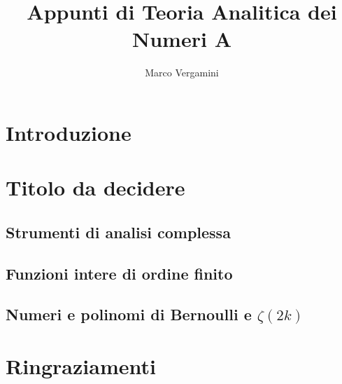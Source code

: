 \documentclass{article}
\title{Appunti di Teoria Analitica dei Numeri A}
\date{}
\author{Marco Vergamini}
\begin{document}
\maketitle
\newpage
\tableofcontents
\newpage


\section*{Introduzione}


\newpage

\section{Titolo da decidere}

\subsection{Strumenti di analisi complessa}


\subsection{Funzioni intere di ordine finito}


\subsection{Numeri e polinomi di Bernoulli e $\zeta(2k)$}


\newpage



\section*{Ringraziamenti}

\end{document}
